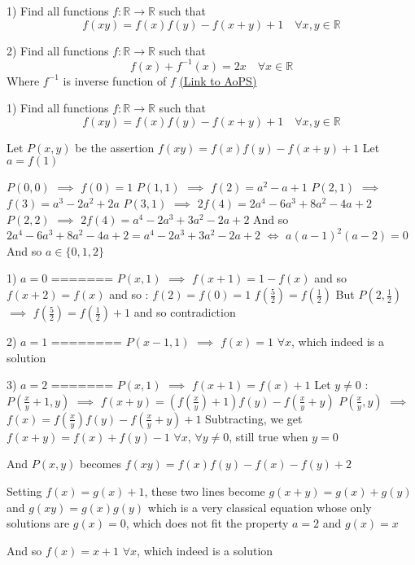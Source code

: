 \begin{problem}
	1) Find all  functions $f:\mathbb{R}\to\mathbb{R}$   such that
\[f(xy)=f(x)f(y)-f(x+y)+1 \quad \forall x,y \in \mathbb{R}\]

2) Find all  functions $f:\mathbb{R}\to\mathbb{R}$   such that
\[f(x)+f^{-1}(x)=2x \quad \forall x\in\mathbb{R}\] 
Where $f^{-1}$ is inverse function of $f$
	\flushright \href{https://artofproblemsolving.com/community/c6h563766}{(Link to AoPS)}
\end{problem}



\begin{solution}
	\begin{tcolorbox}1) Find all  functions $f:\mathbb{R}\to\mathbb{R}$   such that
\[f(xy)=f(x)f(y)-f(x+y)+1 \quad \forall x,y \in \mathbb{R}\]\end{tcolorbox}
Let $P(x,y)$ be the assertion $f(xy)=f(x)f(y)-f(x+y)+1$
Let $a=f(1)$

$P(0,0)$ $\implies$ $f(0)=1$
$P(1,1)$ $\implies$ $f(2)=a^2-a+1$
$P(2,1)$ $\implies$ $f(3)=a^3-2a^2+2a$
$P(3,1)$ $\implies$ $2f(4)=2a^4-6a^3+8a^2-4a+2$
$P(2,2)$ $\implies$ $2f(4)=a^4-2a^3+3a^2-2a+2$
And so $2a^4-6a^3+8a^2-4a+2=a^4-2a^3+3a^2-2a+2$ $\iff$ $a(a-1)^2(a-2)=0$ And so $a\in\{0,1,2\}$

1) $a=0$
=======
$P(x,1)$ $\implies$ $f(x+1)=1-f(x)$ and so $f(x+2)=f(x)$ and so :
$f(2)=f(0)=1$
$f(\frac 52)=f(\frac 12)$
But $P(2,\frac 12)$ $\implies$ $f(\frac 52)=f(\frac 12)+1$ and so contradiction

2) $a=1$
========
$P(x-1,1)$ $\implies$  $\boxed{f(x)=1}$ $\forall x$, which indeed is a solution

3) $a=2$
=======
$P(x,1)$ $\implies$ $f(x+1)=f(x)+1$
Let $y\ne 0$ : 
$P(\frac xy+1,y)$ $\implies$ $f(x+y)=(f(\frac xy)+1)f(y)-f(\frac xy+y)$
$P(\frac xy,y)$ $\implies$ $f(x)=f(\frac xy)f(y)-f(\frac xy+y)+1$
Subtracting, we get $f(x+y)=f(x)+f(y)-1$ $\forall x$, $\forall y\ne 0$, still true when $y=0$

And $P(x,y)$ becomes $f(xy)=f(x)f(y)-f(x)-f(y)+2$

Setting $f(x)=g(x)+1$, these two lines become $g(x+y)=g(x)+g(y)$ and $g(xy)=g(x)g(y)$ which is a very classical equation whose only solutions are $g(x)=0$, which does not fit the property $a=2$ and $g(x)=x$

And so $\boxed{f(x)=x+1}$ $\forall x$, which indeed is a solution
\end{solution}



